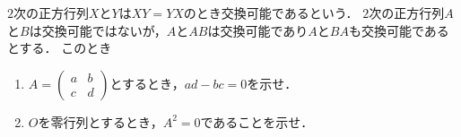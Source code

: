 \documentclass[../../main.tex]{subfiles}
\begin{document}
$2$次の正方行列$X$と$Y$は$XY=YX$のとき交換可能であるという．
$2$次の正方行列$A$と$B$は交換可能ではないが，$A$と$AB$は交換可能であり$A$と$BA$も交換可能であるとする．
このとき
\begin{enumerate}
  \item $A=
    \begin{pmatrix} a&b\\ c&d
    \end{pmatrix}$とするとき，$ad-bc=0$を示せ．
  \item $O$を零行列とするとき，$A^2=0$であることを示せ．
\end{enumerate}
\end{document}
